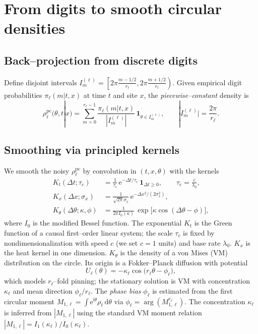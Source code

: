 \documentclass[11pt]{article}
\newcommand{\ud}{\mathrm{d}}
\newcommand{\e}{\mathrm{e}}
\newcommand{\ii}{\mathrm{i}}
\begin{document}
\section{From digits to smooth circular densities}
\label{sec:kernels}
\subsection{Back--projection from discrete digits}
Define disjoint intervals $I_{m}^{(\ell)}=\left[2\pi\frac{m-1/2}{r_\ell},2\pi\frac{m+1/2}{r_\ell}\right)$.
Given empirical digit probabilities $\pi_\ell(m|t,x)$ at time $t$ and site $x$, the \emph{piecewise--constant} density is
\begin{equation}
\rho_\ell^{\mathrm{pc}}(\theta,t|x)=\sum_{m=0}^{r_\ell-1}\frac{\pi_\ell(m|t,x)}{|I_m^{(\ell)}|}\,\mathbf{1}_{\theta\in I_m^{(\ell)}},\qquad |I_m^{(\ell)}|=\frac{2\pi}{r_\ell}.
\end{equation}

\subsection{Smoothing via principled kernels}
We smooth the noisy $\rho_\ell^{\mathrm{pc}}$ by convolution in $(t,x,\theta)$ with the kernels
\begin{align}
K_t(\Delta t;\tau_c)&=\frac{1}{\tau_c}\,\e^{-\Delta t/\tau_c}\,\mathbf{1}_{\Delta t\ge 0},\qquad \tau_c=\frac{c}{\lambda_0},\label{eq:Kt}\\
K_x(\Delta x;\sigma_x)&=\frac{1}{\sqrt{2\pi}\sigma_x}\,\e^{-\Delta x^2/(2\sigma_x^2)},\\
K_\theta(\Delta\theta;\kappa,\phi)&=\frac{1}{2\pi I_0(\kappa)}\,\exp\!\bigl[\kappa\cos(\Delta\theta-\phi)\bigr],\label{eq:Ktheta}
\end{align}
where $I_0$ is the modified Bessel function.
The exponential $K_t$ is the Green function of a causal first--order linear system; the scale $\tau_c$ is fixed by nondimensionalization with speed $c$ (we set $c=1$ units) and base rate $\lambda_0$.
$K_x$ is the heat kernel in one dimension.
$K_\theta$ is the density of a von Mises (VM) distribution on the circle. Its origin is a Fokker--Planck diffusion with potential
\begin{equation}
U_\ell(\theta)=-\kappa_\ell \cos\!\bigl(r_\ell\theta-\phi_\ell\bigr),
\end{equation}
which models $r_\ell$--fold pinning; the stationary solution is VM with concentration $\kappa_\ell$ and mean direction $\phi_\ell/r_\ell$. The \emph{phase bias} $\phi_\ell$ is estimated from the first circular moment $M_{1,\ell}=\int \e^{\ii\theta}\rho_\ell\,\ud\theta$ via $\phi_\ell=\arg(M_{1,\ell}^{r_\ell})$.
The concentration $\kappa_\ell$ is inferred from $|M_{1,\ell}|$ using the standard VM moment relation $|M_{1,\ell}|=I_1(\kappa_\ell)/I_0(\kappa_\ell)$.
\end{document}
